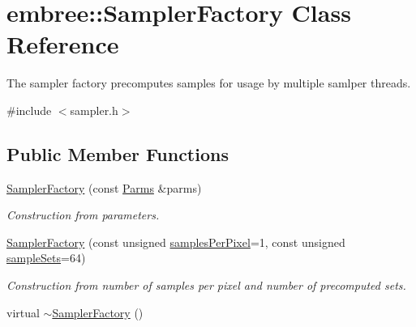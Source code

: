 \hypertarget{classembree_1_1_sampler_factory}{
\section{embree::SamplerFactory Class Reference}
\label{classembree_1_1_sampler_factory}
}


The sampler factory precomputes samples for usage by multiple samlper threads.  




{\ttfamily \#include $<$sampler.h$>$}

\subsection*{Public Member Functions}
\begin{DoxyCompactItemize}
\item 
\hyperlink{classembree_1_1_sampler_factory_a65e53f7ee328a878d06caa10416db128}{SamplerFactory} (const \hyperlink{classembree_1_1_parms}{Parms} \&parms)
\begin{DoxyCompactList}\small\item\em Construction from parameters. \item\end{DoxyCompactList}\item 
\hyperlink{classembree_1_1_sampler_factory_a92c4b61a35341ef709e909e7a4149cbe}{SamplerFactory} (const unsigned \hyperlink{classembree_1_1_sampler_factory_ae275dc3161d4a7c2a5643abf5bdcd1ef}{samplesPerPixel}=1, const unsigned \hyperlink{classembree_1_1_sampler_factory_adb750ed990fe1b5668c93d1d7ce65e73}{sampleSets}=64)
\begin{DoxyCompactList}\small\item\em Construction from number of samples per pixel and number of precomputed sets. \item\end{DoxyCompactList}\item 
\hypertarget{classembree_1_1_sampler_factory_a9dcf08285f0ce65355d32520a0e2048b}{
virtual \hyperlink{classembree_1_1_sampler_factory_a9dcf08285f0ce65355d32520a0e2048b}{$\sim$SamplerFactory} ()}
\label{classembree_1_1_sampler_factory_a9dcf08285f0ce65355d32520a0e2048b}


\end{DoxyCompactItemize}
